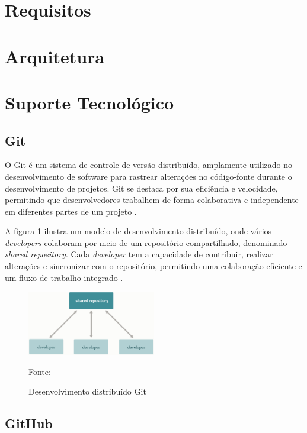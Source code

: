 \section{Requisitos}

\section{Arquitetura}

\section{Suporte Tecnológico}

\subsection{Git}

O Git é um sistema de controle de versão distribuído, amplamente utilizado no desenvolvimento de software para rastrear alterações no código-fonte durante o desenvolvimento de projetos. Git se destaca por sua eficiência e velocidade, permitindo que desenvolvedores trabalhem de forma colaborativa e independente em diferentes partes de um projeto \cite{git2025}.

A figura \ref{fig:git2025} ilustra um modelo de desenvolvimento distribuído, onde vários \textit{developers} colaboram por meio de um repositório compartilhado, denominado \textit{shared repository}. Cada \textit{developer} tem a capacidade de contribuir, realizar alterações e sincronizar com o repositório, permitindo uma colaboração eficiente e um fluxo de trabalho integrado \cite{git2025}.

\begin{figure}[h!]
    \centering
    \includegraphics[width=0.5\textwidth]{figuras/git_distribiuted_work.eps}
    \caption{Desenvolvimento distribuído Git}
    Fonte: \cite{git2025}
    \label{fig:git2025}
\end{figure}

\subsection{GitHub}

